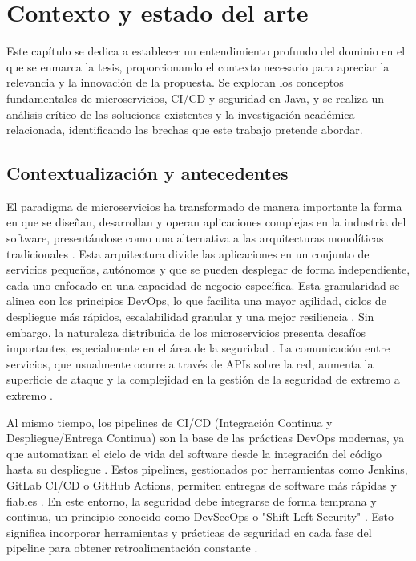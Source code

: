 \chapter{Contexto y estado del arte}\label{chap:contexto_estado_arte}
Este capítulo se dedica a establecer un entendimiento profundo del dominio en el que se enmarca la tesis, proporcionando el contexto necesario para apreciar la relevancia y la innovación de la propuesta. Se exploran los conceptos fundamentales de microservicios, CI/CD y seguridad en Java, y se realiza un análisis crítico de las soluciones existentes y la investigación académica relacionada, identificando las brechas que este trabajo pretende abordar.

\section{Contextualización y antecedentes}\label{sec:contextyantec}
El paradigma de microservicios ha transformado de manera importante la forma en que se diseñan, desarrollan y operan aplicaciones complejas en la industria del software, presentándose como una alternativa a las arquitecturas monolíticas tradicionales \cite{Zafeiropoulos2023SecurityGaps}. Esta arquitectura divide las aplicaciones en un conjunto de servicios pequeños, autónomos y que se pueden desplegar de forma independiente, cada uno enfocado en una capacidad de negocio específica. Esta granularidad se alinea con los principios DevOps, lo que facilita una mayor agilidad, ciclos de despliegue más rápidos, escalabilidad granular y una mejor resiliencia \cite{Scheerer2020ValueMicroservices}. Sin embargo, la naturaleza distribuida de los microservicios presenta desafíos importantes, especialmente en el área de la seguridad \cite{Zafeiropoulos2023SecurityGaps, AlDhuraibi2022SecurityIssues}. La comunicación entre servicios, que usualmente ocurre a través de APIs sobre la red, aumenta la superficie de ataque y la complejidad en la gestión de la seguridad de extremo a extremo \cite{AlDhuraibi2022SecurityIssues}.

Al mismo tiempo, los pipelines de CI/CD (Integración Continua y Despliegue/Entrega Continua) son la base de las prácticas DevOps modernas, ya que automatizan el ciclo de vida del software desde la integración del código hasta su despliegue \cite{Laukkanen2017BenefitsChallengesCICD, Duvall2007ContinuousIntegration}. Estos pipelines, gestionados por herramientas como Jenkins, GitLab CI/CD o GitHub Actions, permiten entregas de software más rápidas y fiables \cite{Laukkanen2017BenefitsChallengesCICD}. En este entorno, la seguridad debe integrarse de forma temprana y continua, un principio conocido como DevSecOps o "Shift Left Security" \cite{Myrbakken2019DevSecOpsSLR}. Esto significa incorporar herramientas y prácticas de seguridad en cada fase del pipeline para obtener retroalimentación constante \cite{Myrbakken2019DevSecOpsSLR, Kumar2022DevSecOpsReview}.

